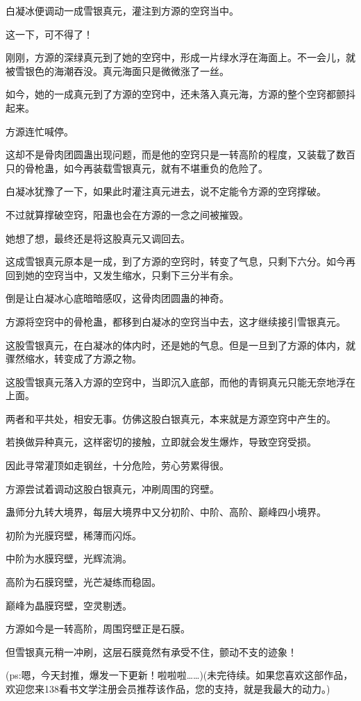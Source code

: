 \begin{this_body}
白凝冰便调动一成雪银真元，灌注到方源的空窍当中。

这一下，可不得了！

刚刚，方源的深绿真元到了她的空窍中，形成一片绿水浮在海面上。不一会儿，就被雪银色的海潮吞没。真元海面只是微微涨了一丝。

如今，她的一成真元到了方源的空窍中，还未落入真元海，方源的整个空窍都颤抖起来。

方源连忙喊停。

这却不是骨肉团圆蛊出现问题，而是他的空窍只是一转高阶的程度，又装载了数百只的骨枪蛊，如今再装载雪银真元，就有不堪重负的危险了。

白凝冰犹豫了一下，如果此时灌注真元进去，说不定能令方源的空窍撑破。

不过就算撑破空窍，阳蛊也会在方源的一念之间被摧毁。

她想了想，最终还是将这股真元又调回去。

这成雪银真元原本是一成，到了方源的空窍时，转变了气息，只剩下六分。如今再回到她的空窍当中，又发生缩水，只剩下三分半有余。

倒是让白凝冰心底暗暗感叹，这骨肉团圆蛊的神奇。

方源将空窍中的骨枪蛊，都移到白凝冰的空窍当中去，这才继续接引雪银真元。

这股雪银真元，在白凝冰的体内时，还是她的气息。但是一旦到了方源的体内，就骤然缩水，转变成了方源之物。

这股雪银真元落入方源的空窍中，当即沉入底部，而他的青铜真元只能无奈地浮在上面。

两者和平共处，相安无事。仿佛这股白银真元，本来就是方源空窍中产生的。

若换做异种真元，这样密切的接触，立即就会发生爆炸，导致空窍受损。

因此寻常灌顶如走钢丝，十分危险，劳心劳累得很。

方源尝试着调动这股白银真元，冲刷周围的窍壁。

蛊师分九转大境界，每层大境界中又分初阶、中阶、高阶、巅峰四小境界。

初阶为光膜窍壁，稀薄而闪烁。

中阶为水膜窍壁，光辉流淌。

高阶为石膜窍壁，光芒凝练而稳固。

巅峰为晶膜窍壁，空灵剔透。

方源如今是一转高阶，周围窍壁正是石膜。

但雪银真元稍一冲刷，这层石膜竟然有承受不住，颤动不支的迹象！

(ps:嗯，今天封推，爆发一下更新！啦啦啦……)(未完待续。如果您喜欢这部作品，欢迎您来138看书文学注册会员推荐该作品，您的支持，就是我最大的动力。)

\end{this_body}

